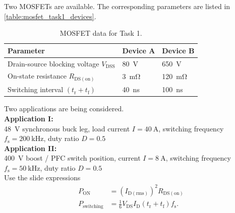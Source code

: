 



Two MOSFETs are available. The corresponding parameters are listed in \autoref{table:mosfet_task1_devices}.

\begin{table}[ht]
    \centering
    \begin{tabular}{lll}
        \toprule
        Parameter & Device A & Device B \\
        \midrule
        Drain-source blocking voltage $V_\mathrm{DSS}$ & \SI{80}{\volt} & \SI{650}{\volt} \\
        On-state resistance $R_\mathrm{DS(on)}$ & \SI{3}{\milli\ohm} & \SI{120}{\milli\ohm} \\
        Switching interval $(t_\mathrm{r} + t_\mathrm{f})$ & \SI{40}{\nano\second} & \SI{100}{\nano\second} \\
        \bottomrule
    \end{tabular}
    \caption{MOSFET data for Task 1.}
    \label{table:mosfet_task1_devices}
\end{table}

Two applications are being considered. \\
\textbf{Application I:} \\
\SI{48}{\volt} synchronous buck leg, load current $I = \SI{40}{\ampere}$, switching frequency $f_\mathrm{s} = \SI{200}{\kilo\hertz}$, \newline
duty ratio $D = 0.5$ \\

\textbf{Application II:} \\
\SI{400}{\volt} boost / PFC switch position, current $I = \SI{8}{\ampere}$, switching frequency $f_\mathrm{s} = \SI{50}{\kilo\hertz}$, \newline
duty ratio $D = 0.5$ \\

Use the slide expressions
\begin{align}
    P_\mathrm{ON} &= \left(I_\mathrm{D(rms)} \right)^2 R_\mathrm{DS(on)} \\
    P_\mathrm{switching} &= \frac{1}{6} V_\mathrm{DS} I_\mathrm{D} (t_\mathrm{r} + t_\mathrm{f}) f_\mathrm{s}.
\end{align}


